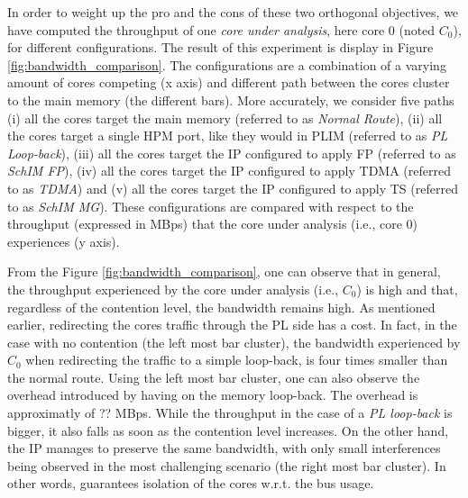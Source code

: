     In order to weight up the pro and the cons of these two orthogonal objectives, we have computed the throughput of one \emph{core under analysis}, here core 0 (noted $C_{0}$), for different configurations. The result of this experiment is display in Figure \ref{fig:bandwidth_comparison}. The configurations are a combination of a varying amount of cores competing (x axis) and different path between the cores cluster to the main memory (the different bars). More accurately, we consider five paths (i) all the cores target the main memory (referred to as \emph{Normal Route}), (ii) all the cores target a single HPM port, like they would in PLIM \cite{PLIM20} (referred to as \emph{PL Loop-back}), (iii) all the cores target the \schim IP configured to apply FP (referred to as \emph{SchIM FP}), (iv) all the cores target the \schim IP configured to apply TDMA (referred to as \emph{TDMA}) and (v) all the cores target the \schim IP configured to apply TS (referred to as \emph{SchIM MG}). These configurations are compared with respect to the throughput (expressed in MBps) that the core under analysis (i.e., core 0) experiences (y axis).
    
    From the Figure \ref{fig:bandwidth_comparison}, one can observe that in general, the throughput experienced by the core under analysis (i.e., $C_{0}$) is high and that, regardless of the contention level, the bandwidth remains high. As mentioned earlier, redirecting the cores traffic through the PL side has a cost. In fact, in the case with no contention (the left most bar cluster), the bandwidth experienced by $C_{0}$ when redirecting the traffic to a simple loop-back, is four times smaller than the normal route.
    Using the left most bar cluster, one can also observe the overhead introduced by having \schim on the memory loop-back. The overhead is approximatly of ?? MBps.
    While the throughput in the case of a \emph{PL loop-back} is bigger, it also falls as soon as the contention level increases.
    On the other hand, the \schim IP manages to preserve the same bandwidth, with only small interferences being observed in the most challenging scenario (the right most bar cluster). In other words, \schim guarantees isolation of the cores w.r.t. the bus usage.
     
